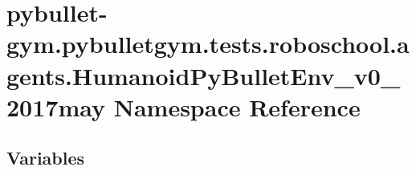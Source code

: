 \hypertarget{namespacepybullet-gym_1_1pybulletgym_1_1tests_1_1roboschool_1_1agents_1_1_humanoid_py_bullet_env__v0__2017may}{}\section{pybullet-\/gym.pybulletgym.\+tests.\+roboschool.\+agents.\+Humanoid\+Py\+Bullet\+Env\+\_\+v0\+\_\+2017may Namespace Reference}
\label{namespacepybullet-gym_1_1pybulletgym_1_1tests_1_1roboschool_1_1agents_1_1_humanoid_py_bullet_env__v0__2017may}
\subsection*{Variables}
